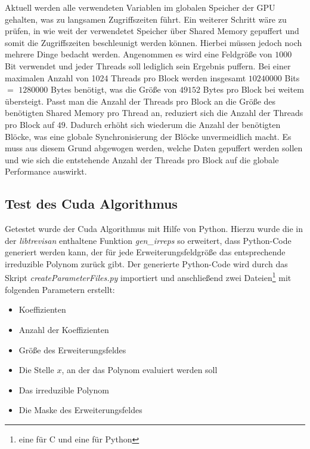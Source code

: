 {Aktuell werden alle verwendeten Variablen im globalen Speicher der GPU gehalten, was zu langsamen Zugriffszeiten führt. Ein weiterer Schritt wäre zu prüfen, in wie weit der verwendetet Speicher über Shared Memory gepuffert und somit die Zugriffszeiten beschleunigt werden können. Hierbei müssen jedoch noch mehrere Dinge bedacht werden. Angenommen es wird eine Feldgröße von $1000$ Bit verwendet und jeder Threads soll lediglich sein Ergebnis puffern. Bei einer maximalen Anzahl von 1024 Threads pro Block werden insgesamt $10240000$ Bits $=$ $1280000$ Bytes benötigt, was die Größe von $49152$ Bytes pro Block bei weitem übersteigt. Passt man die Anzahl der Threads pro Block an die Größe des benötigten Shared Memory pro Thread an, reduziert sich die Anzahl der Threads pro Block auf $49$. Dadurch erhöht sich wiederum die Anzahl der benötigten Blöcke, was eine globale Synchronisierung der Blöcke unvermeidlich macht. Es muss aus diesem Grund abgewogen werden, welche Daten gepuffert werden sollen und wie sich die entstehende Anzahl der Threads pro Block auf die globale Performance auswirkt.

\subsection{Test des Cuda Algorithmus}
Getestet wurde der Cuda Algorithmus mit Hilfe von Python. Hierzu wurde die in der \textit{libtrevisan} enthaltene Funktion \textit{gen\_irreps} so erweitert, dass Python-Code generiert werden kann, der für jede Erweiterungsfeldgröße das entsprechende irreduzible Polynom zurück gibt. Der generierte Python-Code wird durch das Skript \textit{createParameterFiles.py} importiert und anschließend zwei Dateien\footnote{eine für C und eine für Python} mit folgenden Parametern erstellt:

\begin{itemize}
\item Koeffizienten
\item Anzahl der Koeffizienten
\item Größe des Erweiterungsfeldes
\item Die Stelle $x$, an der das Polynom evaluiert werden soll
\item Das irreduzible Polynom
\item Die Maske des Erweiterungsfeldes
\end{itemize}

}
